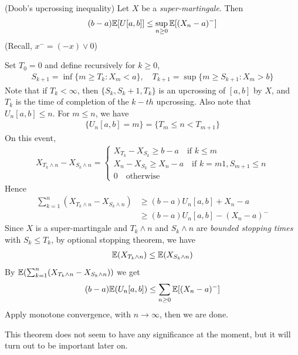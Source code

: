\documentclass[10pt,a4paper]{report}
\newenvironment{proof}
{\begin{changemargin}{1cm}{0.5cm} 
	}%
	{\end{changemargin}
}
\begin{document}
(Doob's upcrossing inequality) Let $X$ be a \emph{super-martingale}. Then
\begin{align*}
(b-a) \mathbb{E}[U[a,b]] \leq \sup_{n\geq 0} \mathbb{E}[(X_n-a)^{-}]
\end{align*}
(Recall, $x^- = (-x) \vee 0$)
\begin{proof}
Set $T_0 =0$ and define recursively for $k\geq 0$,
\begin{align*}
S_{k+1} = \inf \{m\geq T_k : X_m <a \}, \quad T_{k+1} = \sup \{m\geq S_{k+1} : X_m >b \}
\end{align*}
Note that if $T_k < \infty$, then $\{S_k, S_{k}+1, T_k \}$ is an upcrossing of $[a,b]$ by $X$, and $T_k$ is the time of completion of the $k-th$ upcrossing.
\quad Also note that $U_n [a,b] \leq n$. For $m\leq n$, we have
\begin{align*}
\{U_n[a,b] =m \} = \{T_m \leq n < T_{m+1} \}
\end{align*}
On this event,
\begin{align*}
X_{T_k \wedge n}  - X_{S_k \wedge n} = \begin{cases}
X_{T_k} - X_{S_k} \geq b-a \quad \text{if } k\leq m \\
X_n - X_{S_k} \geq X_n -a \quad \text{if } k =m1, S_{m+1} \leq n \\
0 \quad \text{otherwise}
\end{cases}
\end{align*}
Hence
\begin{align*}
\sum_{k=1}^n (X_{T_k \wedge n} - X_{S_k \wedge n}) &\geq (b-a) U_n[a,b] + X_n - a \\
&\geq (b-a)U_n[a,b] -(X_n -a)^-
\end{align*}
Since $X$ is a super-martingale and $T_k \wedge n$ and $S_k \wedge n$ are \emph{bounded stopping times} with $S_k \leq T_k$, by optional stopping theorem, we have
\begin{align*}
\mathbb{E} (X_{T_k \wedge n})\leq \mathbb{E}(X_{S_k \wedge n})
\end{align*}
By $\mathbb{E}(\sum_{k=1}^n (X_{T_k \wedge n} - X_{S_k \wedge n}))$ we get
\begin{align*}
(b-a) \mathbb{E}(U_n[a,b]) \leq \sum_{n\geq 0} \mathbb{E}[(X_n-a)^-]
\end{align*}
Apply monotone convergence, with $n\rightarrow \infty$, then we are done.

\eop
\end{proof}
\s

This theorem does not seem to have any significance at the moment, but it will turn out to be important later on.
\end{document}
